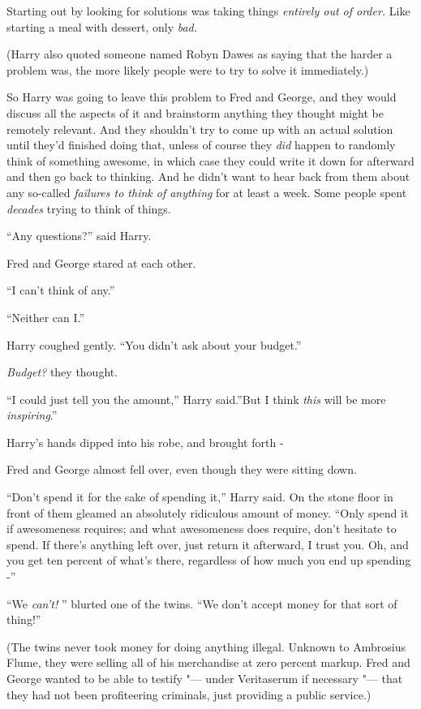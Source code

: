 Starting out by looking for solutions was taking things \emph{entirely
out of order.} Like starting a meal with dessert, only \emph{bad.}

(Harry also quoted someone named Robyn Dawes as saying that the harder a
problem was, the more likely people were to try to solve it
immediately.)

So Harry was going to leave this problem to Fred and George, and they
would discuss all the aspects of it and brainstorm anything they thought
might be remotely relevant. And they shouldn't try to come up with an
actual solution until they'd finished doing that, unless of course they
\emph{did} happen to randomly think of something awesome, in which case
they could write it down for afterward and then go back to thinking. And
he didn't want to hear back from them about any so-called \emph{failures
to think of anything} for at least a week. Some people spent
\emph{decades} trying to think of things.

``Any questions?'' said Harry.

Fred and George stared at each other.

``I can't think of any.''

``Neither can I.''

Harry coughed gently. ``You didn't ask about your budget.''

\emph{Budget?} they thought.

``I could just tell you the amount,'' Harry said.''But I think
\emph{this} will be more \emph{inspiring}.''

Harry's hands dipped into his robe, and brought forth -

Fred and George almost fell over, even though they were sitting down.

``Don't spend it for the sake of spending it,'' Harry said. On the stone
floor in front of them gleamed an absolutely ridiculous amount of money.
``Only spend it if awesomeness requires; and what awesomeness does
require, don't hesitate to spend. If there's anything left over, just
return it afterward, I trust you. Oh, and you get ten percent of what's
there, regardless of how much you end up spending -''

``We \emph{can't!} '' blurted one of the twins. ``We don't accept money
for that sort of thing!''

(The twins never took money for doing anything illegal. Unknown to
Ambrosius Flume, they were selling all of his merchandise at zero
percent markup. Fred and George wanted to be able to testify "--- under
Veritaserum if necessary "--- that they had not been profiteering
criminals, just providing a public service.)

